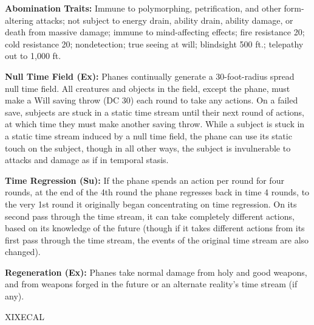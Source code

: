 \documentclass{article}
\begin{document}
\textbf{Abomination Traits:} Immune to polymorphing, petrification, and other form-altering 
attacks; not subject to energy drain, ability drain, ability damage, or death from 
massive damage; immune to mind-affecting effects; fire resistance 20; cold resistance 
20; nondetection; true seeing at will; blindsight 500 ft.; telepathy out to 1,000 
ft. 

\textbf{Null Time Field (Ex):} Phanes continually generate a 30-foot-radius spread 
null time field. All creatures and objects in the field, except the phane, must 
make a Will saving throw (DC 30) each round to take any actions. On a failed save, 
subjects are stuck in a static time stream until their next round of actions, at 
which time they must make another saving throw. While a subject is stuck in a static 
time stream induced by a null time field, the phane can use its static touch on 
the subject, though in all other ways, the subject is invulnerable to attacks and 
damage as if in temporal stasis. 

\textbf{Time Regression (Su):} If the phane spends an action per round for four 
rounds, at the end of the 4th round the phane regresses back in time 4 rounds, 
to the very 1st round it originally began concentrating on time regression. On 
its second pass through the time stream, it can take completely different actions, 
based on its knowledge of the future (though if it takes different actions from 
its first pass through the time stream, the events of the original time stream 
are also changed). 

\textbf{Regeneration (Ex):} Phanes take normal damage from holy and good weapons, 
and from weapons forged in the future or an alternate reality's time stream (if 
any). 

\vspace{12pt}
{\LARGE{}XIXECAL }
\end{document}
